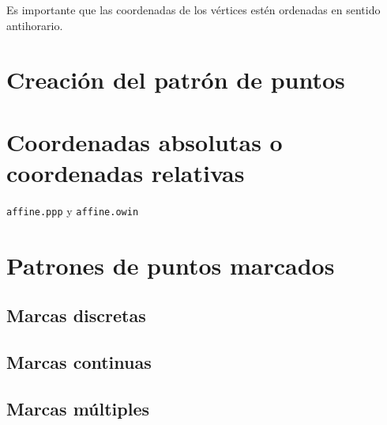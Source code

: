 \documentclass[
  letterpaper,
  DIV=11,
  numbers=noendperiod]{scrreprt}
\begin{document}
\begin{tcolorbox}[enhanced jigsaw, left=2mm, titlerule=0mm, opacitybacktitle=0.6, leftrule=.75mm, colframe=quarto-callout-warning-color-frame, toptitle=1mm, colback=white, breakable, rightrule=.15mm, opacityback=0, colbacktitle=quarto-callout-warning-color!10!white, coltitle=black, bottomtitle=1mm, title=\textcolor{quarto-callout-warning-color}{\faExclamationTriangle}\hspace{0.5em}{Advertencia}, arc=.35mm, bottomrule=.15mm, toprule=.15mm]
Es importante que las coordenadas de los vértices estén ordenadas en
sentido antihorario.
\end{tcolorbox}

\hypertarget{creaciuxf3n-del-patruxf3n-de-puntos}{%
\section{Creación del patrón de
puntos}\label{creaciuxf3n-del-patruxf3n-de-puntos}}

\hypertarget{coordenadas-absolutas-o-coordenadas-relativas}{%
\section{Coordenadas absolutas o coordenadas
relativas}\label{coordenadas-absolutas-o-coordenadas-relativas}}

\texttt{affine.ppp} y \texttt{affine.owin}

\hypertarget{patrones-de-puntos-marcados}{%
\section{Patrones de puntos
marcados}\label{patrones-de-puntos-marcados}}

\hypertarget{marcas-discretas}{%
\subsection{Marcas discretas}\label{marcas-discretas}}

\hypertarget{marcas-continuas}{%
\subsection{Marcas continuas}\label{marcas-continuas}}

\hypertarget{marcas-muxfaltiples}{%
\subsection{Marcas múltiples}\label{marcas-muxfaltiples}}
\end{document}
